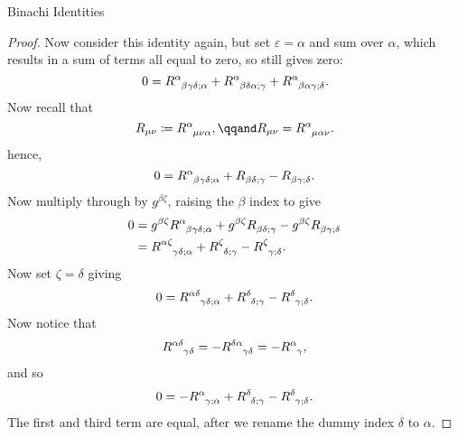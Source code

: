\documentclass[fleqn]{NotesClass}
\begin{document}
\begin{lma}{Binachi Identities}{}
\begin{proof}
            Now consider this identity again, but set \(\varepsilon = \alpha\) and sum over \(\alpha\), which results in a sum of terms all equal to zero, so still gives zero:
            \begin{equation}
                0 = \tensor{R}{^\alpha_{\beta\gamma\delta;\alpha}} + \tensor{R}{^\alpha_{\beta\delta\alpha;\gamma}} + \tensor{R}{^\alpha_{\beta\alpha\gamma;\delta}}.
            \end{equation}
            Now recall that
            \begin{equation}
                R_{\mu\nu} \coloneqq \tensor{R}{^\alpha_{\mu\nu\alpha}}, \qqand R_{\mu\nu} = \tensor{R}{^\alpha_{\mu\alpha\nu}}.
            \end{equation}
            hence,
            \begin{equation}
                0 = \tensor{R}{^\alpha_{\beta\gamma\delta;\alpha}} + \tensor{R}{_{\beta\delta;\gamma}} - \tensor{R}{_{\beta\gamma;\delta}}.
            \end{equation}
            Now multiply through by \(g^{\beta\zeta}\), raising the \(\beta\) index to give
            \begin{align}
                0 &= g^{\beta\zeta}\tensor{R}{^\alpha_{\beta\gamma\delta;\alpha}} + g^{\beta\zeta}\tensor{R}{_{\beta\delta;\gamma}} - g^{\beta\zeta}\tensor{R}{_{\beta\gamma;\delta}}\\
                &= \tensor{R}{^{\alpha\zeta}_{\gamma\delta;\alpha}} + \tensor{R}{^\zeta_{\delta;\gamma}} - \tensor{R}{^\zeta_{\gamma;\delta}}.
            \end{align}
            Now set \(\zeta = \delta\) giving
            \begin{equation}
                0 = \tensor{R}{^{\alpha\delta}_{\gamma\delta;\alpha}} + \tensor{R}{^\delta_{\delta;\gamma}} - \tensor{R}{^\delta_{\gamma;\delta}}.
            \end{equation}
            Now notice that
            \begin{equation}
                \tensor{R}{^{\alpha\delta}_{\gamma\delta}} = -\tensor{R}{^{\delta\alpha}_{\gamma\delta}} = -\tensor{R}{^\alpha_\gamma},
            \end{equation}
            and so
            \begin{equation}
                0 = -\tensor{R}{^\alpha_{\gamma;\alpha}} + \tensor{R}{^\delta_{\delta;\gamma}} - \tensor{R}{^\delta_{\gamma;\delta}}.
            \end{equation}
            The first and third term are equal, after we rename the dummy index \(\delta\) to \(\alpha\).

\end{proof}
\end{lma}
\end{document}
